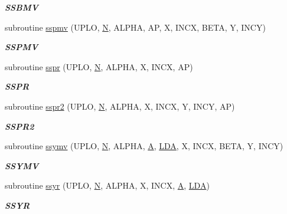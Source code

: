 \begin{DoxyCompactItemize}
\begin{DoxyCompactList}\small\item\em {\bfseries S\+S\+B\+M\+V} \end{DoxyCompactList}\item 
subroutine \hyperlink{group__single__blas__level2_gad1af0d0777da05d1c27ea99a69c8017c}{sspmv} (U\+P\+L\+O, \hyperlink{polmisc_8c_a0240ac851181b84ac374872dc5434ee4}{N}, A\+L\+P\+H\+A, A\+P, X, I\+N\+C\+X, B\+E\+T\+A, Y, I\+N\+C\+Y)
\begin{DoxyCompactList}\small\item\em {\bfseries S\+S\+P\+M\+V} \end{DoxyCompactList}\item 
subroutine \hyperlink{group__single__blas__level2_ga13dca9a765471c68248e8e00190f4d4d}{sspr} (U\+P\+L\+O, \hyperlink{polmisc_8c_a0240ac851181b84ac374872dc5434ee4}{N}, A\+L\+P\+H\+A, X, I\+N\+C\+X, A\+P)
\begin{DoxyCompactList}\small\item\em {\bfseries S\+S\+P\+R} \end{DoxyCompactList}\item 
subroutine \hyperlink{group__single__blas__level2_gafa776cb448d7c8bc8acfaf7f6d283959}{sspr2} (U\+P\+L\+O, \hyperlink{polmisc_8c_a0240ac851181b84ac374872dc5434ee4}{N}, A\+L\+P\+H\+A, X, I\+N\+C\+X, Y, I\+N\+C\+Y, A\+P)
\begin{DoxyCompactList}\small\item\em {\bfseries S\+S\+P\+R2} \end{DoxyCompactList}\item 
subroutine \hyperlink{group__single__blas__level2_gabbe9933ddf6f0137156d4f2491f2afdb}{ssymv} (U\+P\+L\+O, \hyperlink{polmisc_8c_a0240ac851181b84ac374872dc5434ee4}{N}, A\+L\+P\+H\+A, \hyperlink{classA}{A}, \hyperlink{example__user_8c_ae946da542ce0db94dced19b2ecefd1aa}{L\+D\+A}, X, I\+N\+C\+X, B\+E\+T\+A, Y, I\+N\+C\+Y)
\begin{DoxyCompactList}\small\item\em {\bfseries S\+S\+Y\+M\+V} \end{DoxyCompactList}\item 
subroutine \hyperlink{group__single__blas__level2_ga7b8a99048765ed2bf7c1e770bff0b622}{ssyr} (U\+P\+L\+O, \hyperlink{polmisc_8c_a0240ac851181b84ac374872dc5434ee4}{N}, A\+L\+P\+H\+A, X, I\+N\+C\+X, \hyperlink{classA}{A}, \hyperlink{example__user_8c_ae946da542ce0db94dced19b2ecefd1aa}{L\+D\+A})
\begin{DoxyCompactList}\small\item\em {\bfseries S\+S\+Y\+R} \end{DoxyCompactList}\item 

\end{DoxyCompactItemize}
